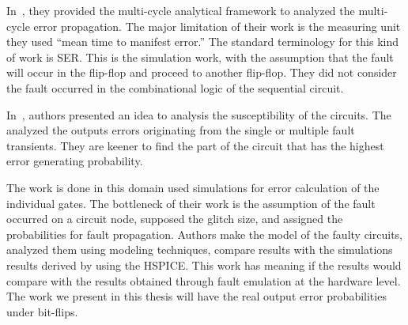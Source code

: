 In~\citep{asadi2005soft}, they provided the multi-cycle analytical framework to analyzed the multi-cycle error
propagation. The major limitation of their work is the measuring unit they used  “mean time
to manifest error.” The standard terminology for this kind of work is SER. This is the simulation work,
with the assumption that the fault will occur in the flip-flop and proceed to another flip-flop. They did not
consider the fault occurred in the combinational logic of the sequential circuit.

In~\citep{miskov2010multiple}, authors presented an idea to analysis the susceptibility of the circuits. The analyzed the outputs
errors originating from the single or multiple fault transients. They are keener to find the part of
the circuit that has the highest error generating probability.





The work is done in this domain used simulations for error calculation of the individual gates. The bottleneck of their work is the assumption of the fault occurred on a circuit node, supposed the glitch size, and assigned the
probabilities for fault propagation.  Authors make the model of the faulty circuits, analyzed them using modeling techniques, compare results with the simulations results derived by using the
HSPICE. This work has meaning if the results would compare with the results obtained through fault emulation at the hardware level. The work we present in this thesis will have the real output error probabilities under bit-flips.












\label{related}





